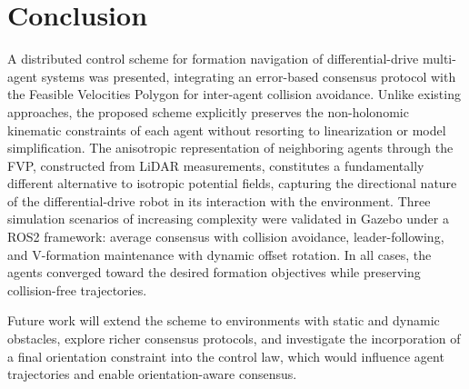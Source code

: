 \section{Conclusion}

A distributed control scheme for formation navigation of differential-drive multi-agent systems was presented, integrating an error-based consensus protocol with the Feasible Velocities Polygon for inter-agent collision avoidance. Unlike existing approaches, the proposed scheme explicitly preserves the non-holonomic kinematic constraints of each agent without resorting to linearization or model simplification. The anisotropic representation of neighboring agents through the FVP, constructed from LiDAR measurements, constitutes a fundamentally different alternative to isotropic potential fields, capturing the directional nature of the differential-drive robot in its interaction with the environment. Three simulation scenarios of increasing complexity were validated in Gazebo under a ROS2 framework: average consensus with collision avoidance, leader-following, and V-formation maintenance with dynamic offset rotation. In all cases, the agents converged toward the desired formation objectives while preserving collision-free trajectories.

Future work will extend the scheme to environments with static and dynamic obstacles, explore richer consensus protocols, and investigate the incorporation of a final orientation constraint into the control law, which would influence agent trajectories and enable orientation-aware consensus.